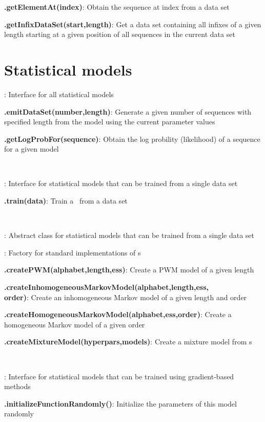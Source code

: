 \documentclass[10pt]{scrartcl}
\newcommand{\entry}[3]{{\bfseries #1#2}: #3}
\begin{document}
\begin{flushleft}
\entry{\DataSet}{.getElementAt(index)}{Obtain the sequence at index from a data set}

\entry{\DataSet}{.getInfixDataSet(start,length)}{Get a data set containing all infixes of a given length starting at a given position of all sequences in the current data set}


\section{Statistical models}

\entry{\StatMod}{}{Interface for all statistical models}

\entry{\StatMod}{.emitDataSet(number,length)}{Generate a given number of sequences with specified length from the model using the current parameter values}

\entry{\StatMod}{.getLogProbFor(sequence)}{Obtain the log probility (likelihood) of a sequence for a given model}

~

\entry{\TrainSM}{}{Interface for statistical models that can be trained from a single data set}

\entry{\TrainSM}{.train(data)}{Train a \TrainSM~from a data set}

~

\entry{\AbstractTrainSM}{}{Abstract class for statistical models that can be trained from a single data set}

\entry{\TrainSMFactory}{}{Factory for standard implementations of \TrainSM s}

\entry{\TrainSMFactory}{.createPWM(alphabet,length,ess)}{Create a PWM model of a given length}

\entry{\TrainSMFactory}{.createInhomogeneousMarkovModel(alphabet,length,ess,\\order)}{Create an inhomogeneous Markov model of a given length and order}

\entry{\TrainSMFactory}{.createHomogeneousMarkovModel(alphabet,ess,order)}{Create a homogeneous Markov model of a given order}

\entry{\TrainSMFactory}{.createMixtureModel(hyperpars,models)}{Create a mixture model from \TrainSM s}

~

\entry{\DiffSM}{}{Interface for statistical models that can be trained using gradient-based methods}

\entry{\DiffSM}{.initializeFunctionRandomly()}{Initialize the parameters of this model randomly}


\end{flushleft}
\end{document}
